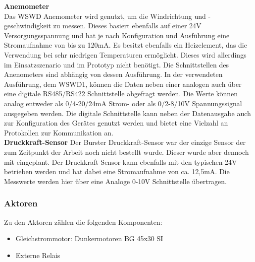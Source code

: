 \noindent\textbf{Anemometer}\\
Das WSWD Anemometer wird genutzt, um die Windrichtung und -geschwindigkeit zu messen. Dieses basiert ebenfalls auf einer 24V Versorgungsspannung und hat je nach Konfiguration und Ausführung eine Stromaufnahme von bis zu 120mA. Es besitzt ebenfalls ein Heizelement, das die Verwendung bei sehr niedrigen Temperaturen ermöglicht. Dieses wird allerdings im Einsatzszenario und im Prototyp nicht benötigt. Die Schnittstellen des Anenometers sind abhängig von dessen Ausführung. In der verwendeten Ausführung, dem WSWD1, können die Daten neben einer analogen auch über eine digitale RS485/RS422 Schnittstelle abgefragt werden. Die Werte können analog entweder als 0/4-20/24mA Strom- oder als 0/2-8/10V Spannungssignal ausgegeben werden. Die digitale Schnittstelle kann neben der Datenausgabe auch zur Konfiguration des Gerätes genutzt werden und bietet eine Vielzahl an Protokollen zur Kommunikation an.\\

\noindent\textbf{Druckkraft-Sensor}\newline
Der Burster Druckkraft-Sensor war der einzige Sensor der zum Zeitpunkt der Arbeit noch nicht bestellt wurde. Dieser wurde aber dennoch mit eingeplant. Der Druckkraft Sensor kann ebenfalls mit den typischen 24V betrieben werden und hat dabei eine Stromaufnahme von ca. 12,5mA. Die Messwerte werden hier über eine Analoge 0-10V Schnittstelle übertragen.\\
\subsubsection{Aktoren}
Zu den Aktoren zählen die folgenden Komponenten:
\begin{itemize}
	\item Gleichstrommotor: Dunkermotoren BG 45x30 SI
	\item Externe Relais
\end{itemize}

